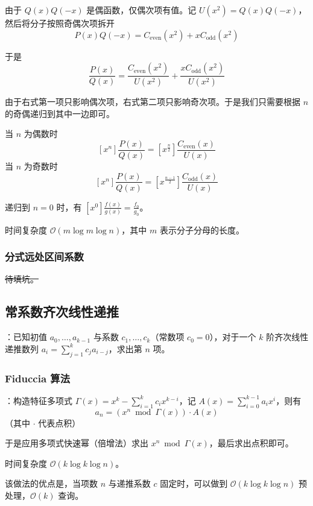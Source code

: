 由于 $Q(x)Q(-x)$ 是偶函数，仅偶次项有值。记 $U(x^2) = Q(x)Q(-x)$，然后将分子按照奇偶次项拆开
\[
P(x)Q(-x) = C_{\mathrm{even}}(x^2) + xC_{\mathrm{odd}}(x^2)
\]

于是
\[
\frac{P(x)}{Q(x)} = \frac{C_{\mathrm{even}}(x^2)}{U(x^2)} + \frac{xC_{\mathrm{odd}}(x^2)}{U(x^2)}
\]

由于右式第一项只影响偶次项，右式第二项只影响奇次项。于是我们只需要根据 $n$ 的奇偶递归到其中一边即可。

当 $n$ 为偶数时
\[
[x^n]\frac{P(x)}{Q(x)} = [x^\frac{n}{2}]\frac{C_{\mathrm{even}}(x)}{U(x)}
\]
当 $n$ 为奇数时
\[
[x^n]\frac{P(x)}{Q(x)} = [x^{\frac{n - 1}{2}}]\frac{C_{\mathrm{odd}}(x)}{U(x)}
\]

递归到 $n = 0$ 时，有 $[x^0]\frac{f(x)}{g(x)} = \frac{f_0}{g_0}$。

时间复杂度 $\mathcal{O}(m \log m \log n)$，其中 $m$ 表示分子分母的长度。


\subsubsection{分式远处区间系数}

\sout{待填坑。}

\subsection{常系数齐次线性递推}

：已知初值 $a_0, \dots, a_{k - 1}$ 与系数 $c_1, \dots, c_k$（常数项 $c_0 = 0$），对于一个 $k$ 阶齐次线性递推数列 $a_i = \sum_{j = 1}^k c_ja_{i - j}$，求出第 $n$ 项。

\subsubsection{Fiduccia 算法}

：构造特征多项式 $\Gamma(x) = x^k - \sum_{i = 1}^{k}c_ix^{k - i}$，记 $A(x) = \sum_{i = 0}^{k - 1} a_ix^i$，则有
\[
a_n = \left(x^n \bmod \Gamma(x) \right) \cdot A(x)
\]
（其中 $\cdot$ 代表点积）

于是应用多项式快速幂（倍增法）求出 $x^n \bmod \Gamma(x)$，最后求出点积即可。

时间复杂度 $\mathcal{O}(k \log k \log n)$。

该做法的优点是，当项数 $n$ 与递推系数 $c$ 固定时，可以做到 $\mathcal{O}(k \log k \log n)$ 预处理，$\mathcal{O}(k)$ 查询。

